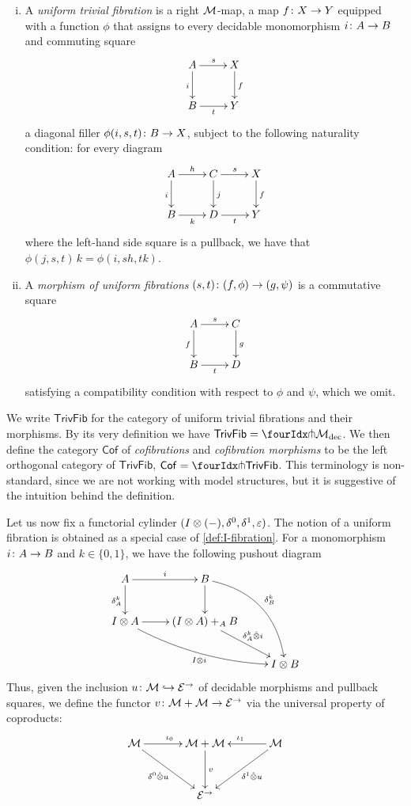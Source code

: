 \documentclass[reqno,10pt,a4paper,oneside]{amsart}
\begin{document}
\begin{definition} \hfill
\begin{enumerate}[(i)]
\item A \emph{uniform trivial  fibration} is a right $\cal{M}$-map, \ie a map
$f  \co X \to Y$ equipped with a function $\phi$
that assigns to every decidable monomorphism $i \co A \to B$ and commuting square 
 \[
 \xymatrix{
 A \ar[r]^s \ar[d]_i & X \ar[d]^f \\
 B \ar[r]_t & Y}
 \]
a diagonal filler $\phi(i, s, t) \co B \to X$, subject to the following naturality condition: for every 
diagram 
\[
\xymatrix{
A \ar[r]^{h} \ar[d]_{i} & C \ar[d]^{j}  \ar[r]^s & X \ar[d]^f \\
B \ar[r]_{k} & D \ar[r]_t & Y }
\]
where the left-hand side square is a pullback, we have that $\phi(j, s, t) \, k = \phi(i, s  h, t  k)$.
 \item A \emph{morphism of uniform  fibrations} $(s, t) \co (f, \phi) \to (g, \psi)$ is a commutative
 square
 \[
 \xymatrix{
  A \ar[d]_f \ar[r]^s & C \ar[d]^g \\
  B \ar[r]_{t}& D} 
  \]
  satisfying a compatibility condition with respect to $\phi$ and $\psi$, which we omit. 
\end{enumerate}
\end{definition}

We write $\mathsf{TrivFib}$ for the category of uniform trivial fibrations and their morphisms.
By its very definition we have $\mathsf{TrivFib} = \liftr{\cal{M}_{\textup{dec}}}$. We then define
the category $\mathsf{Cof}$ of \emph{cofibrations} and \emph{cofibration morphisms} to be the left orthogonal
category of $\mathsf{TrivFib}$, \ie $\mathsf{Cof} = \liftl{\mathsf{TrivFib}}$. This terminology is non-standard,
since we are not working with model structures, but it is suggestive of the intuition behind the definition.

\medskip

Let us now fix a functorial cylinder $(\interval \otimes (-), \lcyl, \rcyl, \ccyl)$. The notion of a uniform fibration is obtained 
as a special case of \cref{def:I-fibration}. For a monomorphism $i \co A \to B$
and $k \in \{0 , 1\}$, we have the following pushout diagram
\[
\xymatrix{
 A \ar[r]^{i}  \ar[d]_{\delta^k_A} &  B \ar@/^2em/[ddr]^{\delta^k_B} \ar[d] & \\ 
\interval \otimes A \ar@/_1em/[drr]_{\interval \otimes i} \ar[r] & (\interval \otimes A) +_A B \ar[dr]^-{\kcyl_A \hatotimes i}  & \\ 
 & & \interval \otimes B}
 \]
 Thus, given the inclusion $u \co \cal{M} \hookrightarrow \cal{E}^\to$ of decidable morphisms and pullback squares, 
 we define the functor $v \co \cal{M} + \cal{M} \to \cal{E}^\to$  via the universal
 property of coproducts:
  \[
 \xymatrix@R=1.2cm@C=1.2cm{
 \cal{M} \ar[dr]_-{\lcyl \hatotimes u}  \ar[r]^{\iota_0} &  \cal{M} + \cal{M} 
 \ar[d]^{v} & \cal{M} \ar[dl]^-{\rcyl \hatotimes u} \ar[l]_{\iota_1} \\
  & \cal{E}^\to & }
  \]
 
\end{document}
